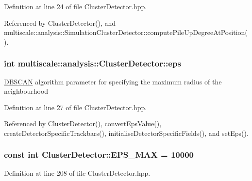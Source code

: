 \-Definition at line 24 of file \-Cluster\-Detector.\-hpp.



\-Referenced by \-Cluster\-Detector(), and multiscale\-::analysis\-::\-Simulation\-Cluster\-Detector\-::compute\-Pile\-Up\-Degree\-At\-Position().

\hypertarget{classmultiscale_1_1analysis_1_1ClusterDetector_a61e876f87d62245eada8f56d587d39cd}{
\subsubsection[{eps}]{\setlength{\rightskip}{0pt plus 5cm}int {\bf multiscale\-::analysis\-::\-Cluster\-Detector\-::eps}}}\label{classmultiscale_1_1analysis_1_1ClusterDetector_a61e876f87d62245eada8f56d587d39cd}
\hyperlink{classmultiscale_1_1analysis_1_1DBSCAN}{\-D\-B\-S\-C\-A\-N} algorithm parameter for specifying the maximum radius of the neighbourhood 

\-Definition at line 27 of file \-Cluster\-Detector.\-hpp.



\-Referenced by \-Cluster\-Detector(), convert\-Eps\-Value(), create\-Detector\-Specific\-Trackbars(), initialise\-Detector\-Specific\-Fields(), and set\-Eps().

\hypertarget{classmultiscale_1_1analysis_1_1ClusterDetector_a76d0b4ecd2793d478317cc1bc856e06f}{
\subsubsection[{\-E\-P\-S\-\_\-\-M\-A\-X}]{\setlength{\rightskip}{0pt plus 5cm}const int {\bf \-Cluster\-Detector\-::\-E\-P\-S\-\_\-\-M\-A\-X} = 10000}}\label{classmultiscale_1_1analysis_1_1ClusterDetector_a76d0b4ecd2793d478317cc1bc856e06f}


\-Definition at line 208 of file \-Cluster\-Detector.\-hpp.



